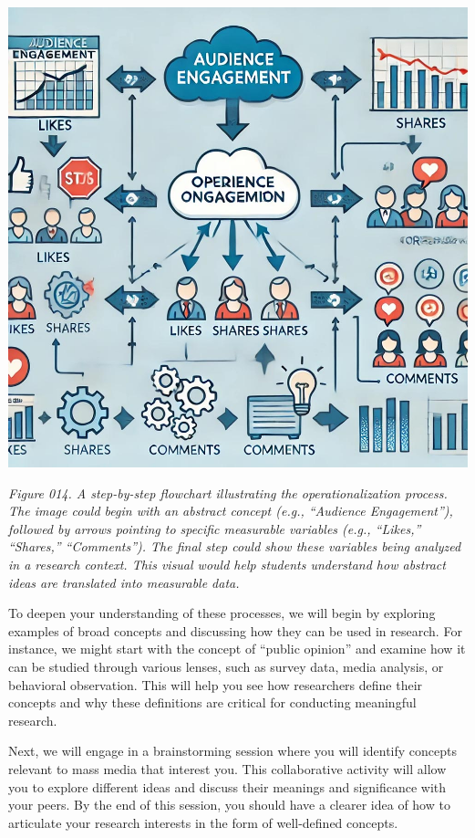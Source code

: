 \documentclass[
]{book}
\begin{document}
\includegraphics[width=1\linewidth,height=\textheight,keepaspectratio]{images/fig014.jpg}

\emph{Figure 014. A step-by-step flowchart illustrating the operationalization process. The image could begin with an abstract concept (e.g., ``Audience Engagement''), followed by arrows pointing to specific measurable variables (e.g., ``Likes,'' ``Shares,'' ``Comments''). The final step could show these variables being analyzed in a research context. This visual would help students understand how abstract ideas are translated into measurable data.}

To deepen your understanding of these processes, we will begin by exploring examples of broad concepts and discussing how they can be used in research. For instance, we might start with the concept of ``public opinion'' and examine how it can be studied through various lenses, such as survey data, media analysis, or behavioral observation. This will help you see how researchers define their concepts and why these definitions are critical for conducting meaningful research.

Next, we will engage in a brainstorming session where you will identify concepts relevant to mass media that interest you. This collaborative activity will allow you to explore different ideas and discuss their meanings and significance with your peers. By the end of this session, you should have a clearer idea of how to articulate your research interests in the form of well-defined concepts.
\end{document}
